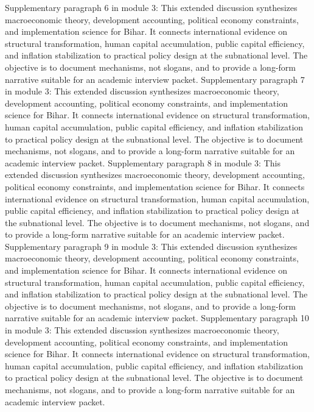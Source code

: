 \documentclass[preprint,12pt]{elsarticle}
\begin{document}
Supplementary paragraph 6 in module 3: This extended discussion synthesizes macroeconomic theory, development accounting, political economy constraints, and implementation science for Bihar. It connects international evidence on structural transformation, human capital accumulation, public capital efficiency, and inflation stabilization to practical policy design at the subnational level. The objective is to document mechanisms, not slogans, and to provide a long-form narrative suitable for an academic interview packet.
Supplementary paragraph 7 in module 3: This extended discussion synthesizes macroeconomic theory, development accounting, political economy constraints, and implementation science for Bihar. It connects international evidence on structural transformation, human capital accumulation, public capital efficiency, and inflation stabilization to practical policy design at the subnational level. The objective is to document mechanisms, not slogans, and to provide a long-form narrative suitable for an academic interview packet.
Supplementary paragraph 8 in module 3: This extended discussion synthesizes macroeconomic theory, development accounting, political economy constraints, and implementation science for Bihar. It connects international evidence on structural transformation, human capital accumulation, public capital efficiency, and inflation stabilization to practical policy design at the subnational level. The objective is to document mechanisms, not slogans, and to provide a long-form narrative suitable for an academic interview packet.
Supplementary paragraph 9 in module 3: This extended discussion synthesizes macroeconomic theory, development accounting, political economy constraints, and implementation science for Bihar. It connects international evidence on structural transformation, human capital accumulation, public capital efficiency, and inflation stabilization to practical policy design at the subnational level. The objective is to document mechanisms, not slogans, and to provide a long-form narrative suitable for an academic interview packet.
Supplementary paragraph 10 in module 3: This extended discussion synthesizes macroeconomic theory, development accounting, political economy constraints, and implementation science for Bihar. It connects international evidence on structural transformation, human capital accumulation, public capital efficiency, and inflation stabilization to practical policy design at the subnational level. The objective is to document mechanisms, not slogans, and to provide a long-form narrative suitable for an academic interview packet.
\end{document}
